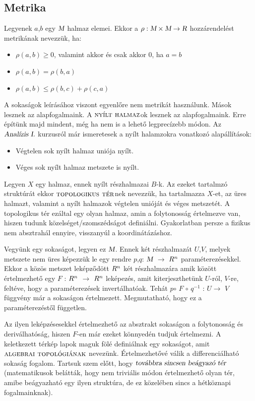 \documentclass[a4paper,12pt]{article}
\begin{document}
\subsection{ Metrika}
\par Legyenek $a$,$b$ egy $\textsl{M}$ halmaz elemei. Ekkor a $\rho : \textsl{M} \times \textsl{M} \rightarrow \textsl{R}$ hozzárendelést metrikának nevezzük, ha:
\begin{itemize}
\item $\rho(a,b) \geq 0$, valamint akkor és csak akkor $0$, ha $a = b$
\item $\rho(a,b) = \rho(b,a)$
\item $\rho(a,b) \leq \rho(b,c) + \rho(c,a)$
\end{itemize}
\par A sokaságok leírásához viszont egyenlőre nem metrikát használunk. Mások lesznek az alapfogalmaink. A $\textsc{nyílt halmaz}$ok lesznek az alapfogalmaink. Erre építünk majd mindent, még ha nem is a lehető legprecízebb módon. Az $\textsl{Analízis I.}$ kurzusról már ismeretesek a nyílt halamzokra vonatkozó alapállítások:
\begin{itemize}
\item Végtelen sok nyílt halmaz uniója nyílt.
\item Véges sok nyílt halmaz metszete is nyílt.
\end{itemize}
\par Legyen $X$ egy halmaz, ennek nyílt részhalmazai $B$-k. Az ezeket tartalmzó struktúrát ekkor $\textsc{topologikus tér}$nek nevezzük, ha tartalmazza $X$-et, az üres halmazt, valamint a nyílt halmazok végtelen unióját és véges metszetét. A topologikus tér ezáltal egy olyan halmaz, amin a folytonosság értelmezve van, hiszen tudunk közelséget/szomszédságot definiálni. Gyakorlatban persze a fizikus nem absztrahál ennyire, visszanyúl a koordinátázáshoz.
\par Vegyünk egy sokaságot, legyen ez $\textsl{M}$. Ennek két részhalmazát $U$,$V$, melyek metszete nem üres képezzük le egy  rendre $p$,$q$: $\textsl{M}$  $\rightarrow$ $\textsl{$R^{n}$}$ paraméterezésekkel. Ekkor a közös metszet leképződött $\textsl{$R^{n}$}$ két részhalmazára amik között értelmezhető egy $F$ : $\textsl{$R^{n}$}$ $\rightarrow$ $\textsl{$R^{n}$}$ leképezés, amit kiterjeszthetünk $U$-ról, $V$-re, feltéve, hogy a paraméterezések invertálhatóak. Tehát $p$$\circ$ $F$ $\circ$ $q^{-1}$ : $U$$\rightarrow$ $V$ függvény már a sokaságon értelmezett. Megmutatható, hogy ez a paraméterezéstől független. 
\par Az ilyen leképzésesekkel értelmezhető az absztrakt sokaságon a folytonosság és deriválhatóság, hiszen $F$-en már ezeket könnyedén tudjuk értelmezni. A keletkezett térkép lapok maguk fölé definiálnak egy sokaságot, amit $\textsc{algebrai topológiának}$ nevezünk. Értelmezhetővé válik a differenciálható sokaság fogalom. Tartsuk szem előtt, hogy $\textsl{továbbra sincsen beágyazó tér}$ (matematikusok belátták, hogy nem triviális módon értelmezhető olyan tér, amibe beágyazható egy ilyen struktúra, de ez közelében sincs a hétköznapi fogalmainknak). 
\end{document}

